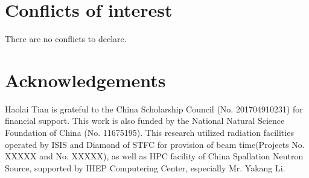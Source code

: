 \documentclass[twoside,twocolumn,9pt]{article}
\begin{document}
%
%
%

\section*{Conflicts of interest}
There are no conflicts to declare.

\section*{Acknowledgements}
Haolai Tian is grateful to the China Scholarship Council (No. 201704910231) for financial support.
This work is also funded by the National Natural Science Foundation of China (No. 11675195).
This research utilized radiation facilities operated by ISIS and Diamond of STFC for provision of beam time(Projects No. XXXXX and No. XXXXX),
as well as HPC facility of China Spallation Neutron Source, supported by IHEP Computering Center, especially Mr. Yakang Li.



\balance


\end{document}
